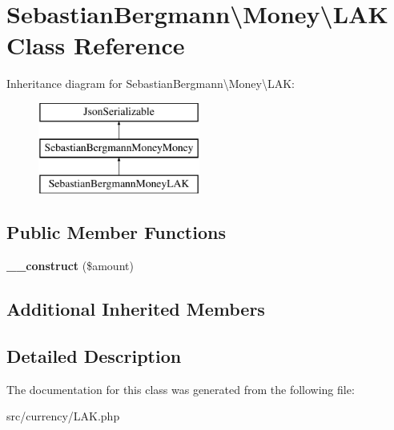 \hypertarget{classSebastianBergmann_1_1Money_1_1LAK}{}\section{Sebastian\+Bergmann\textbackslash{}Money\textbackslash{}L\+A\+K Class Reference}
\label{classSebastianBergmann_1_1Money_1_1LAK}
Inheritance diagram for Sebastian\+Bergmann\textbackslash{}Money\textbackslash{}L\+A\+K\+:\begin{figure}[H]
\begin{center}
\leavevmode
\includegraphics[height=3.000000cm]{classSebastianBergmann_1_1Money_1_1LAK}
\end{center}
\end{figure}
\subsection*{Public Member Functions}
\begin{DoxyCompactItemize}
\item 
\hypertarget{classSebastianBergmann_1_1Money_1_1LAK_aa08f8332aeed610879c00790a70c7f2b}{}{\bfseries \+\_\+\+\_\+construct} (\$amount)\label{classSebastianBergmann_1_1Money_1_1LAK_aa08f8332aeed610879c00790a70c7f2b}

\end{DoxyCompactItemize}
\subsection*{Additional Inherited Members}


\subsection{Detailed Description}


The documentation for this class was generated from the following file\+:\begin{DoxyCompactItemize}
\item 
src/currency/L\+A\+K.\+php\end{DoxyCompactItemize}
